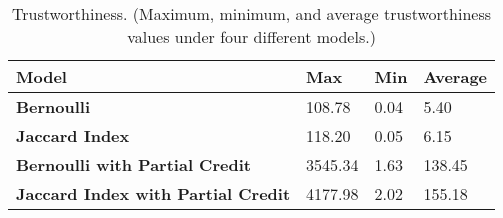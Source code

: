 \begin{table}[h!]
\centering
\footnotesize
{
\begin{tabular}{l|l|l|l}
\hline
Model                & Max     & Min & Average \\
\hline                            
{\bf Bernoulli}                    & 108.78   & 0.04 & 5.40 \\
{\bf Jaccard Index}                & 118.20   & 0.05 & 6.15 \\
{\bf Bernoulli with Partial Credit} & 3545.34  & 1.63 & 138.45 \\
{\bf Jaccard Index with Partial Credit} & 4177.98 & 2.02 & 155.18 \\
\hline
\end{tabular}
}
\caption{Trustworthiness. 
(Maximum, minimum, and average trustworthiness values under four different models.)
}
\label{tab:trust}
\end{table}
